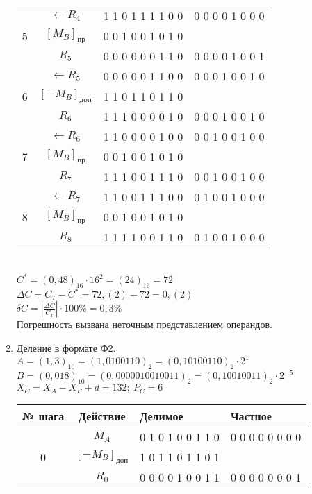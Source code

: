 \documentclass[a4paper, 12pt]{article}
\begin{document}
\begin{enumerate}
\begin{tabular}{|c|c|l|l|}
  	\hline
  	& $\leftarrow R_4$        & 1 1 0 1 1 1 1 0 0 & 0 0 0 0 1 0 0 0 \\
  	5 & $[M_B]_{\mbox{пр}}$   & 0 0 1 0 0 1 0 1 0 & \\
  	& $R_5$                   & 0 0 0 0 0 0 1 1 0 & 0 0 0 0 1 0 0 1 \\
  	\hline
  	& $\leftarrow R_5$        & 0 0 0 0 0 1 1 0 0 & 0 0 0 1 0 0 1 0 \\
  	6 & $[-M_B]_{\mbox{доп}}$ & 1 1 0 1 1 0 1 1 0 & \\
  	& $R_6$                   & 1 1 1 0 0 0 0 1 0 & 0 0 0 1 0 0 1 0 \\
  	\hline
  	& $\leftarrow R_6$        & 1 1 0 0 0 0 1 0 0 & 0 0 1 0 0 1 0 0 \\
  	7 & $[M_B]_{\mbox{пр}}$   & 0 0 1 0 0 1 0 1 0 & \\
  	& $R_7$                   & 1 1 1 0 0 1 1 1 0 & 0 0 1 0 0 1 0 0 \\
  	\hline
  	& $\leftarrow R_7$        & 1 1 0 0 1 1 1 0 0 & 0 1 0 0 1 0 0 0 \\
  	8 & $[M_B]_{\mbox{пр}}$   & 0 0 1 0 0 1 0 1 0 & \\
  	& $R_8$                   & 1 1 1 1 0 0 1 1 0 & 0 1 0 0 1 0 0 0 \\
  	\hline
  \end{tabular}\\
  $C^*=(0,48)_{16}\cdot16^2=(24)_{16}=72$\\
  $\Delta C=C_T-C^*=72,(2)-72=0,(2)$\\
  $\delta C=\left|\frac{\Delta C}{C_T}\right|\cdot100\%=0,3\%$\\
  Погрешность вызвана неточным представлением операндов.
  \newpage
  \item Деление в формате Ф2.\\
  $A=(1,3)_{10}=(1,0100110)_2=(0,10100110)_2\cdot2^1$\\
  $B=(0,018)_{10}=(0,0000010010011)_2=(0,10010011)_2\cdot2^{-5}$\\
  $X_C=X_A-X_B+d=132;\ P_C=6$\\
  \begin{tabular}{|c|c|l|l|}
  	\hline
  	№ шага & Действие         & Делимое           & Частное \\
  	\hline
  	& $M_A$                   & 0 1 0 1 0 0 1 1 0 & 0 0 0 0 0 0 0 0 \\
  	0 & $[-M_B]_{\mbox{доп}}$ & 1 0 1 1 0 1 1 0 1 & \\
  	& $R_0$                   & 0 0 0 0 1 0 0 1 1 & 0 0 0 0 0 0 0 1 \\

\end{tabular}
\end{enumerate}
\end{document}
